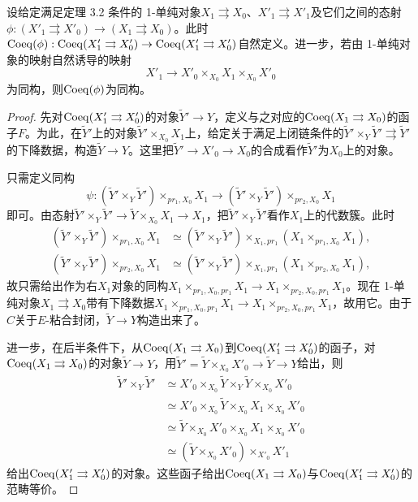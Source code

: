 \begin{theorem}
设给定满足定理 3.2 条件的 1-单纯对象$X_1\rightrightarrows X_0$、$X'_1\rightrightarrows X'_1$及它们之间的态射$\phi:(X'_1\rightrightarrows X'_0)\to(X_1\rightrightarrows X_0)$。此时$\operatorname{Coeq}(\phi):\operatorname{Coeq}(X'_1\rightrightarrows X'_0)\to\operatorname{Coeq}(X'_1\rightrightarrows X'_0)$自然定义。进一步，若由 1-单纯对象的映射自然诱导的映射
\[
X'_1\to X'_0\times_{X_0}X_1\times_{X_0}X'_0
\]
为同构，则$\operatorname{Coeq}(\phi)$为同构。
\end{theorem}

\begin{proof}
先对$\operatorname{Coeq}(X'_1\rightrightarrows X'_0)$的对象$\tilde Y'\to Y$，定义与之对应的$\operatorname{Coeq}(X_1\rightrightarrows X_0)$的函子$F$。为此，在$\tilde Y'$上的对象$\tilde Y'\times_{X_0}X_1$上，给定关于满足上闭链条件的$\tilde Y'\times_Y\tilde Y'\rightrightarrows\tilde Y'$的下降数据，构造$\tilde Y\to Y$。这里把$\tilde Y'\to X'_0\to X_0$的合成看作$\tilde Y'$为$X_0$上的对象。

只需定义同构
\[
\psi:(\tilde Y'\times_Y\tilde Y')\times_{pr_1,X_0}X_1\to(\tilde Y'\times_Y\tilde Y')\times_{pr_2,X_0}X_1
\]
即可。由态射$\tilde Y'\times_Y\tilde Y'\to\tilde Y\times_{X_0}X_1\to X_1$，把$\tilde Y'\times_Y\tilde Y'$看作$X_1$上的代数簇。此时
\begin{align*}
(\tilde Y'\times_Y\tilde Y')\times_{pr_1,X_0}X_1&\simeq(\tilde Y'\times_Y\tilde Y')\times_{X_1,pr_1}(X_1\times_{pr_1,X_0}X_1),\\
(\tilde Y'\times_Y\tilde Y')\times_{pr_2,X_0}X_1&\simeq(\tilde Y'\times_Y\tilde Y')\times_{X_1,pr_1}(X_1\times_{pr_2,X_0}X_1),
\end{align*}
故只需给出作为右$X_1$对象的同构$X_1\times_{pr_1,X_0,pr_1}X_1\to X_1\times_{pr_2,X_0,pr_1}X_1$。现在 1-单纯对象$X_1\rightrightarrows X_0$带有下降数据$X_1\times_{pr_1,X_0,pr_1}X_1\to X_1\times_{pr_2,X_0,pr_1}X_1$，故用它。由于$C$关于$E$-粘合封闭，$\tilde Y\to Y$构造出来了。

进一步，在后半条件下，从$\operatorname{Coeq}(X_1\rightrightarrows X_0)$到$\operatorname{Coeq}(X'_1\rightrightarrows X'_0)$的函子，对$\operatorname{Coeq}(X_1\rightrightarrows X_0)$的对象$\tilde Y\to Y$，用$\tilde Y'=\tilde Y\times_{X_0}X'_0\to\tilde Y\to Y$给出，则
\begin{align*}
\tilde Y'\times_Y\tilde Y'&\simeq X'_0\times_{X_0}\tilde Y\times_Y\tilde Y\times_{X_0}X'_0\\
&\simeq X'_0\times_{X_0}\tilde Y\times_{X_0}X_1\times_{X_0}X'_0\\
&\simeq\tilde Y\times_{X_0}X'_0\times_{X_0}X_1\times_{X_0}X'_0\\
&\simeq(\tilde Y\times_{X_0}X'_0)\times_{X'_0}X'_1
\end{align*}
给出$\operatorname{Coeq}(X'_1\rightrightarrows X'_0)$的对象。这些函子给出$\operatorname{Coeq}(X_1\rightrightarrows X_0)$与$\operatorname{Coeq}(X'_1\rightrightarrows X'_0)$的范畴等价。
\end{proof}

